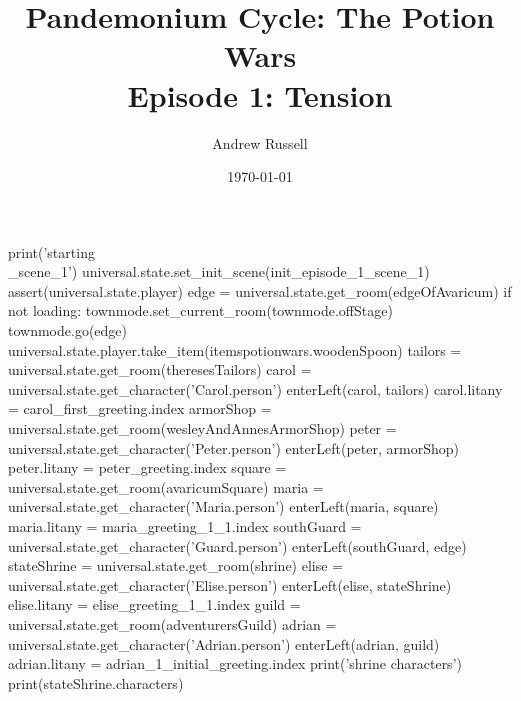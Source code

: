 \documentclass{book}
\title{Pandemonium Cycle: The Potion Wars \\ Episode 1: Tension}
\author{Andrew Russell}
\date{\today}
\begin{document}
\maketitle
\begin{openScene}
    print('starting\\_scene\_1')
    universal.state.set\_init\_scene(init\_episode\_1\_scene\_1)
    assert(universal.state.player)
    edge = universal.state.get\_room(edgeOfAvaricum)
    if not loading:
        townmode.set\_current\_room(townmode.offStage)
        townmode.go(edge)
        universal.state.player.take\_item(itemspotionwars.woodenSpoon)
    tailors = universal.state.get\_room(theresesTailors)
    carol = universal.state.get\_character('Carol.person')
    enterLeft(carol, tailors)
    carol.litany = carol\_first\_greeting.index
    armorShop = universal.state.get\_room(wesleyAndAnnesArmorShop)
    peter = universal.state.get\_character('Peter.person')
    enterLeft(peter, armorShop)
    peter.litany = peter\_greeting.index
    square = universal.state.get\_room(avaricumSquare)
    maria = universal.state.get\_character('Maria.person')
    enterLeft(maria, square)
    maria.litany = maria\_greeting\_1\_1.index
    southGuard = universal.state.get\_character('Guard.person')
    enterLeft(southGuard, edge)
    stateShrine = universal.state.get\_room(shrine)
    elise = universal.state.get\_character('Elise.person')
    enterLeft(elise, stateShrine)
    elise.litany = elise\_greeting\_1\_1.index
    guild = universal.state.get\_room(adventurersGuild)
    adrian = universal.state.get\_character('Adrian.person')
    enterLeft(adrian, guild)
    adrian.litany = adrian\_1\_initial\_greeting.index
    print('shrine characters')
    print(stateShrine.characters)
\end{openScene}
\end{document}
